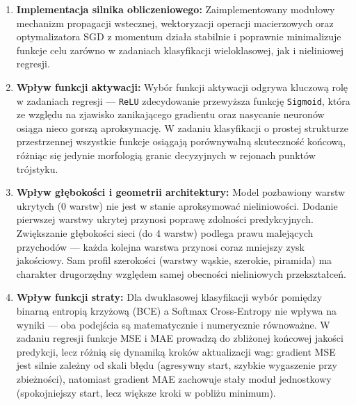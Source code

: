 \documentclass[11pt,a4paper]{article}
\begin{document}
\begin{enumerate}
    \item \textbf{Implementacja silnika obliczeniowego:} 
    Zaimplementowany modułowy mechanizm propagacji wstecznej, wektoryzacji operacji macierzowych oraz optymalizatora SGD z momentum działa stabilnie i poprawnie minimalizuje funkcje celu zarówno w zadaniach klasyfikacji wieloklasowej, jak i nieliniowej regresji.

    \item \textbf{Wpływ funkcji aktywacji:} 
    Wybór funkcji aktywacji odgrywa kluczową rolę w zadaniach regresji — \texttt{ReLU} zdecydowanie przewyższa funkcję \texttt{Sigmoid}, która ze względu na zjawisko zanikającego gradientu oraz nasycanie neuronów osiąga nieco gorszą aproksymację. W zadaniu klasyfikacji o prostej strukturze przestrzennej wszystkie funkcje osiągają porównywalną skuteczność końcową, różniąc się jedynie morfologią granic decyzyjnych w rejonach punktów trójstyku.

    \item \textbf{Wpływ głębokości i geometrii architektury:} 
    Model pozbawiony warstw ukrytych (0 warstw) nie jest w stanie aproksymować nieliniowości. Dodanie pierwszej warstwy ukrytej przynosi poprawę zdolności predykcyjnych. Zwiększanie głębokości sieci (do 4 warstw) podlega prawu malejących przychodów — każda kolejna warstwa przynosi coraz mniejszy zysk jakościowy. Sam profil szerokości (warstwy wąskie, szerokie, piramida) ma charakter drugorzędny względem samej obecności nieliniowych przekształceń.

    \item \textbf{Wpływ funkcji straty:} 
    Dla dwuklasowej klasyfikacji wybór pomiędzy binarną entropią krzyżową (BCE) a Softmax Cross-Entropy nie wpływa na wyniki — oba podejścia są matematycznie i numerycznie równoważne. W zadaniu regresji funkcje MSE i MAE prowadzą do zbliżonej końcowej jakości predykcji, lecz różnią się dynamiką kroków aktualizacji wag: gradient MSE jest silnie zależny od skali błędu (agresywny start, szybkie wygaszenie przy zbieżności), natomiast gradient MAE zachowuje stały moduł jednostkowy (spokojniejszy start, lecz większe kroki w pobliżu minimum).
\end{enumerate}
\end{document}
